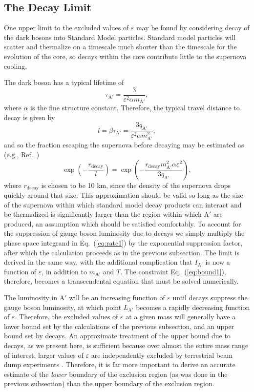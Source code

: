 \documentclass[nofootinbib,prd,superscriptaddress,twocolumn]{revtex4}
\newcommand{\beq}{\begin{equation}}
\newcommand{\eeq}{\end{equation}}
\newcommand{\Aprime}{\mathrm{A}'}
\begin{document}
\subsection{The Decay Limit}

One upper limit to the excluded values of $\varepsilon$ may be found by considering 
decay of the dark bosons into Standard Model particles. Standard model particles will 
scatter and thermalize on a timescale much shorter than the timescale for the evolution 
of the core, so decays within the core contribute little to the supernova cooling. 

The dark boson has a typical lifetime of
\begin{equation}
\tau_{\mathrm{A}'} = \frac{3}{\varepsilon^2 \alpha m_{\mathrm{A}'}},
\end{equation}
where $\alpha$ is the fine structure constant. Therefore,
the typical travel distance to decay is given by 
%
\beq
\label{eq:decaylength}
l = \beta \tau_{\mathrm{A}'} = \frac{3 q_{\mathrm{A}'}}{\varepsilon^2 \alpha m_{\mathrm{A}'}^2},
\eeq
and so the fraction escaping the supernova before decaying may be estimated as (e.g., Ref.~\cite{bjorken_etal09})
\beq
\label{eq:decayfactor}
\exp \left( - \frac{r_{\mathrm{decay}}}{l} \right) = 
\exp \left( - \frac{r_{\mathrm{decay}} m_{\mathrm{A'}}^2\alpha \varepsilon^2}{3 q_{\mathrm{A'}}} \right),
\eeq
%
where $r_\mathrm{decay}$ is chosen to be 10 km, since the density of the supernova drops quickly around that size. This approximation should be valid so long as the size of the supernova within which standard model decay 
products can interact and be thermalized is significantly larger than the region within which $\Aprime$ are produced, 
an assumption which should be satisfied comfortably. 
To account for the suppression of gauge boson luminosity due to decays we simply multiply the phase space 
integrand in Eq.~(\ref{eq:rate1}) by the exponential suppression factor, after which the calculation proceeds 
as in the previous subsection. The limit is derived in the same way, 
with the additional complication that $I_{\mathrm{A}'}$ is now a function of $\varepsilon $, in addition to $m_{\mathrm{A}'}$ and $T$. 
The constraint Eq.~(\ref{eq:bound1}), therefore, becomes a transcendental equation that must be solved numerically. 


The luminosity in $\Aprime$ will be an increasing function of $\varepsilon$ until decays suppress the gauge boson luminosity, 
at which point $L_{\mathrm{A}'}$ becomes a rapidly decreasing function of $\varepsilon$. Therefore, the excluded values of 
$\varepsilon$ at a given mass will generally have a lower bound set by the calculations of the previous subsection, and an 
upper bound set by decays. An approximate treatment of the upper bound due to decays, as we present here, is 
sufficient because over almost the entire mass range of interest, larger values of $\varepsilon$ are independently 
excluded by terrestrial beam dump experiments \cite{bjorken_etal09}. Therefore, it is far more important to 
derive an accurate estimate of the {\em lower} boundary of the exclusion region (as was done in 
the previous subsection) than the upper boundary of the exclusion region.
\end{document}
